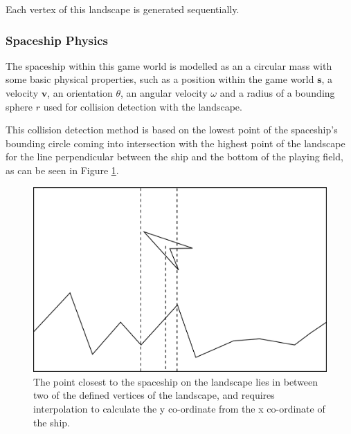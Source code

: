 \documentclass[conference]{IEEEtran}
\begin{document}


Each vertex of this landscape is generated sequentially. %


\subsubsection{Spaceship Physics}

The spaceship within this game world is modelled as an a circular mass with some basic physical properties, such as a position within the game world $\boldsymbol {s}$, a velocity $\boldsymbol {v}$, an orientation $\theta$, an angular velocity $\omega$ and a radius of a bounding sphere $r$ used for collision detection with the landscape.

This collision detection method is based on the lowest point of the spaceship's bounding circle coming into intersection with the highest point of the landscape for the line perpendicular between the ship and the bottom of the playing field, as can be seen in Figure \ref{fig:diagram_landscapepoint}.

\begin{figure}[hbtp]
\centering
\includegraphics[scale=0.4]{img/landscapepoint}
\caption{The point closest to the spaceship on the landscape lies in between two of the defined vertices of the landscape, and requires interpolation to calculate the y co-ordinate from the x co-ordinate of the ship.}
\label{fig:diagram_landscapepoint}
\end{figure}
\end{document}
